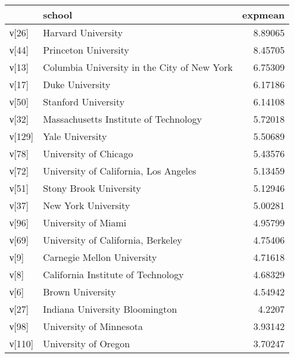 \begin{tabular}{llr}
\hline
        & school                                                         &   expmean \\
\hline
 ν[26]  & Harvard University                                             &  8.89065  \\
 ν[44]  & Princeton University                                           &  8.45705  \\
 ν[13]  & Columbia University in the City of New York                    &  6.75309  \\
 ν[17]  & Duke University                                                &  6.17186  \\
 ν[50]  & Stanford University                                            &  6.14108  \\
 ν[32]  & Massachusetts Institute of Technology                          &  5.72018  \\
 ν[129] & Yale University                                                &  5.50689  \\
 ν[78]  & University of Chicago                                          &  5.43576  \\
 ν[72]  & University of California, Los Angeles                          &  5.13459  \\
 ν[51]  & Stony Brook University                                         &  5.12946  \\
 ν[37]  & New York University                                            &  5.00281  \\
 ν[96]  & University of Miami                                            &  4.95799  \\
 ν[69]  & University of California, Berkeley                             &  4.75406  \\
 ν[9]   & Carnegie Mellon University                                     &  4.71618  \\
 ν[8]   & California Institute of Technology                             &  4.68329  \\
 ν[6]   & Brown University                                               &  4.54942  \\
 ν[27]  & Indiana University Bloomington                                 &  4.2207   \\
 ν[98]  & University of Minnesota                                        &  3.93142  \\
 ν[110] & University of Oregon                                           &  3.70247  \\

\end{tabular}

